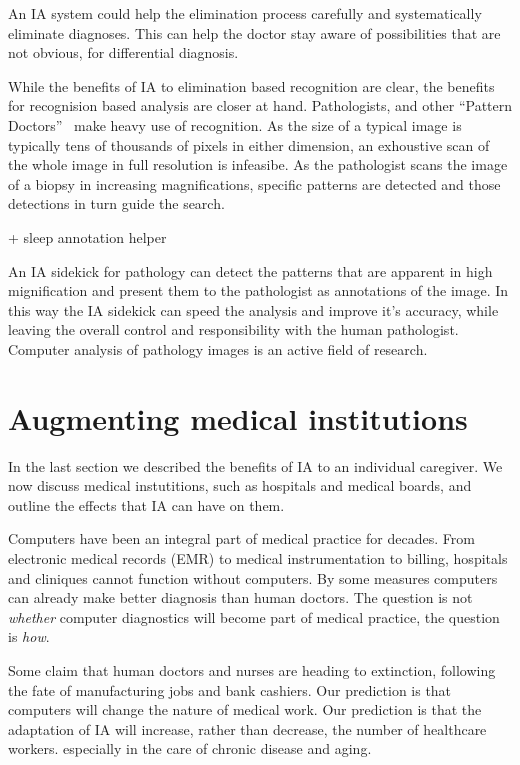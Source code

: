 \documentclass[11pt]{pnas-new}
\begin{document}
An IA system could help the elimination process carefully and
systematically eliminate diagnoses. This can help the doctor stay
aware of possibilities that are not obvious, for differential
diagnosis.

While the benefits of IA to elimination based recognition are clear,
the benefits for recognision based analysis are closer at hand.
Pathologists, and other ``Pattern Doctors''~\cite{Topol} make heavy
use of recognition. As the size of a typical image is typically tens
of thousands of pixels in either dimension, an exhoustive scan of the
whole image in full resolution is infeasibe. As the pathologist scans
the image of a biopsy in increasing magnifications,
specific patterns are detected and those detections in turn guide the search.

+ sleep annotation helper

An IA sidekick for pathology can detect the patterns that are apparent
in high mignification and present them to the pathologist as
annotations of the image. In this way the IA sidekick can speed the
analysis and improve it's accuracy, while leaving the overall control
and responsibility with the human pathologist. Computer analysis of
pathology images is an active field of research.\cite{}


\section{Augmenting medical institutions}

In the last section we described the benefits of IA to an individual
caregiver. We now discuss medical instutitions, such as hospitals and
medical boards, and outline the effects that IA can have on them.

  Computers have been an integral part of medical practice for decades. From
  electronic medical records (EMR) to medical instrumentation to billing,
  hospitals and cliniques cannot function without computers. By some
  measures computers can already make better diagnosis than human
  doctors. The question is not {\em whether} computer diagnostics will
  become part of medical practice, the question is {\em how}.

  
  Some claim that human doctors and nurses are heading to extinction,
  following the fate of manufacturing jobs and bank cashiers.  Our
  prediction is that computers will change the nature of medical
  work. Our prediction is that the adaptation of IA will increase,
  rather than decrease, the number of healthcare workers. especially
  in the care of chronic disease and aging.
\end{document}
